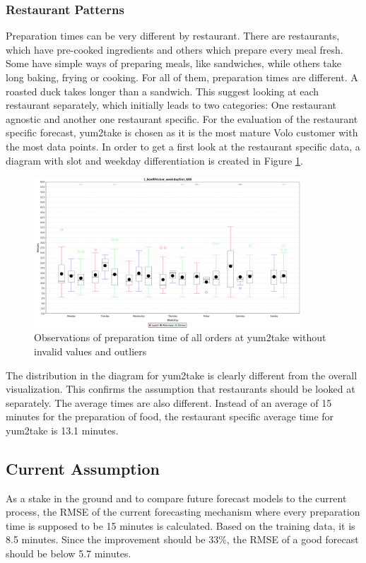 \subsubsection{Restaurant Patterns}\label{subsection:Restaurant Wise Proceeding}
Preparation times can be very different by restaurant. There are restaurants, which have pre-cooked ingredients and others which prepare every meal fresh. Some have simple ways of preparing meals, like sandwiches, while others take long baking, frying or cooking. For all of them, preparation times are different. A roasted duck takes longer than a sandwich.\newline
This suggest looking at each restaurant separately, which initially leads to two categories: One restaurant agnostic and another one restaurant specific. For the evaluation of the restaurant specific forecast, yum2take is chosen as it is the most mature Volo customer with the most data points.\newline
In order to get a first look at the restaurant specific data, a diagram with slot and weekday differentiation is created in Figure \ref{fig:1_boxWhisker_weekdaySlot_686}.
\begin{figure}[h]
\begin{center}
\includegraphics[width=10cm]{images/1_boxWhisker_weekdaySlot_686.png}
\caption{Observations of preparation time of all orders at yum2take without invalid values and outliers}
\label{fig:1_boxWhisker_weekdaySlot_686}
\end{center}
\end{figure}
The distribution in the diagram for yum2take is clearly different from the overall visualization. This confirms the assumption that restaurants should be looked at separately. The average times are also different. Instead of an average of 15 minutes for the preparation of food, the restaurant specific average time for yum2take is 13.1 minutes.
\subsection{Current Assumption}
As a stake in the ground and to compare future forecast models to the current process, the RMSE of the current forecasting mechanism where every preparation time is supposed to be 15 minutes is calculated. Based on the training data, it is 8.5 minutes. Since the improvement should be 33\%, the RMSE of a good forecast should be below 5.7 minutes.
